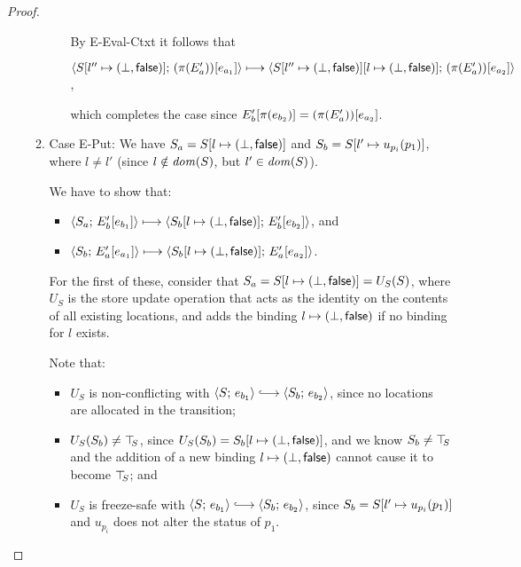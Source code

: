 \begin{proof}
\begin{enumerate}
\begin{enumerate}
\begin{itemize}
        By {\sc E-Eval-Ctxt} it follows that
        
        $\langle S[l'' \mapsto (\bot, \textsf{false})];\, (\pi(E'_a))\hspace{-0.5mm}\left[e_{a_1}\right] \rangle
        \longmapsto \\
        \langle S[l'' \mapsto (\bot, \textsf{false})][l \mapsto (\bot, \textsf{false})];\, (\pi(E'_a))\hspace{-0.5mm}\left[e_{a_2}\right] \rangle$,

        which completes the case since $E'_b\hspace{-0.5mm}\left[\pi(e_{b_2})\right]
        = (\pi(E'_a))\hspace{-0.5mm}\left[e_{a_2}\right]$.


      \end{itemize}

    \item \label{slqc-new-put}Case {\sc E-Put}: We have $S_a =
      S[l \mapsto (\bot, \textsf{false})]$ and $S_b =
      S[l' \mapsto u_{p_i}(p_1)]$, where $l \neq l'$ (since $l
      \notin \mathit{dom}(S)$, but $l' \in \mathit{dom}(S)$).

      We have to show that:
      \begin{itemize}
      \item $\langle S_a;\, E'_b\hspace{-0.5mm}\left[e_{b_1}\right] \rangle \longmapsto
        \langle S_b[l \mapsto (\bot, \textsf{false})];\, E'_b\hspace{-0.5mm}\left[e_{b_2}\right] \rangle$,
        and
      \item $\langle S_b;\, E'_a\hspace{-0.5mm}\left[e_{a_1}\right] \rangle \longmapsto
        \langle S_b[l \mapsto (\bot, \textsf{false})];\, E'_a\hspace{-0.5mm}\left[e_{a_2}\right] \rangle$.
      \end{itemize}

      For the first of these, consider that $S_a =
      S[l \mapsto (\bot, \textsf{false})] = U_S(S)$, where $U_S$ is the
      store update operation that acts as the identity on the contents
      of all existing locations, and adds the binding
      $l \mapsto (\bot, \textsf{false})$ if no binding for $l$
      exists.

      Note that:
      \begin{itemize}
      \item $U_S$ is non-conflicting with $\config{S}{e_{b_1}}
        \parstepsto \config{S_b}{e_{b_2}}$, since no locations are
        allocated in the transition;
      \item $U_S(S_b) \neq \top\hspace{-0.85mm}_{S}$, since $U_S(S_b) =
        S_b[l \mapsto (\bot, \textsf{false})]$, and we know $S_b \neq
        \top\hspace{-0.85mm}_{S}$ and the addition of a new binding
        $l \mapsto (\bot, \textsf{false})$ cannot cause it to
        become $\top\hspace{-0.85mm}_{S}$; and
      \item $U_S$ is freeze-safe with $\config{S}{e_{b_1}} \parstepsto
        \config{S_b}{e_{b_2}}$, since $S_b =
        S[l' \mapsto u_{p_i}(p_1)]$ and $u_{p_i}$ does not alter
        the status of $p_1$.


\end{itemize}
\end{enumerate}
\end{enumerate}
\end{proof}
